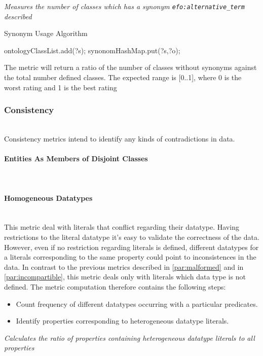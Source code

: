 \begin{mdframed}[style=metricdefinition]
\emph{Measures the number of classes which has a synonym \texttt{efo:alternative\_term} described}
\end{mdframed}

\begin{algorithm}
\caption{Synonym Usage Algorithm}
\begin{algorithmic}[1]
 ontologyClassList.add(?s); \EndIf
{} 
\State synonomHashMap.put(?s,?o);
\EndIf
\EndProcedure
\end{algorithmic}
\end{algorithm}

The metric will return a ratio of the number of classes without synonyms against the total number defined classes. The expected range is [0..1], where 0 is the worst rating and 1 is the best rating

\subsubsection{Consistency}~\\ 

Consistency metrics intend to identify any kinds of contradictions in data.

\paragraph{Entities As Members of Disjoint Classes}~\\


\paragraph{Homogeneous Datatypes}~\\

This metric deal with literals that conflict regarding their datatype.
Having restrictions to the literal datatype it's easy to validate the correctness of the data.
However, even if no restriction regarding literals is defined, different datatypes for a literals corresponding to the same property could point to inconsistences in the data.
In contrast to the previous metrics described in \ref{par:malformed} and in \ref{par:incompartible}, this metric deals only with literals which data type is  not defined. 
The metric computation therefore contains the following steps:
\begin{itemize}
\item Count frequency of different datatypes occurring with a particular predicates.
\item Identify properties corresponding to heterogeneous datatype literals.
\end{itemize}
\begin{mdframed}[style=metricdefinition]
\emph{Calculates the ratio of properties containing heterogeneous datatype literals to all properties}
\end{mdframed}

